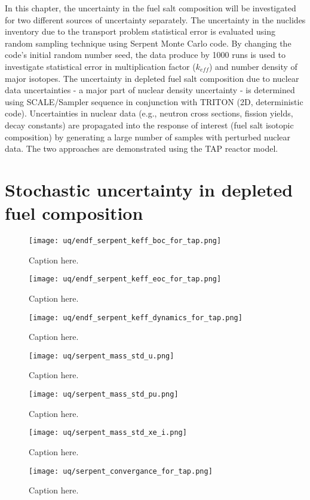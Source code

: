 In this chapter, the uncertainty in the fuel salt composition will be 
investigated for two different sources of uncertainty separately. The 
uncertainty in the nuclides inventory due to the transport problem statistical 
error is evaluated using random sampling technique using Serpent Monte Carlo 
code. By changing the code's initial random number seed, the data produce by 
1000 runs is used to investigate statistical error in multiplication factor 
($k_{eff}$) and number density of major isotopes. The uncertainty in depleted 
fuel salt composition due to nuclear data uncertainties - a major part of 
nuclear density uncertainty - is determined using SCALE/Sampler sequence in 
conjunction with TRITON (2D, deterministic code). Uncertainties in nuclear
data (e.g., neutron cross sections, fission yields, decay constants) are 
propagated into the response of
interest (fuel salt isotopic composition) by 
generating a large number of samples with perturbed nuclear data. The two 
approaches are demonstrated
using the \gls{TAP} reactor model.



\section{Stochastic uncertainty in depleted fuel composition}

\begin{figure}[hbp!] %
	\centering
	\texttt{[image: uq/endf\_serpent\_keff\_boc\_for\_tap.png]}
	\caption{Caption here.}
	\label{fig:11}
\end{figure}
\begin{figure}[hbp!] %
	\centering
	\texttt{[image: uq/endf\_serpent\_keff\_eoc\_for\_tap.png]}
	\caption{Caption here.}
	\label{fig:22}
\end{figure}
\begin{figure}[hbp!] %
	\centering
	\texttt{[image: uq/endf\_serpent\_keff\_dynamics\_for\_tap.png]}
	\caption{Caption here.}
	\label{fig:33}
\end{figure}
\begin{figure}[hbp!] %
	\centering
	\texttt{[image: uq/serpent\_mass\_std\_u.png]}
	\caption{Caption here.}
	\label{fig:44}
\end{figure}
\begin{figure}[hbp!] %
	\centering
	\texttt{[image: uq/serpent\_mass\_std\_pu.png]}
	\caption{Caption here.}
	\label{fig:pu}
\end{figure}
\begin{figure}[hbp!] %
	\centering
	\texttt{[image: uq/serpent\_mass\_std\_xe\_i.png]}
	\caption{Caption here.}
	\label{fig:xe-i}
\end{figure}
\begin{figure}[hbp!] %
	\centering
	\texttt{[image: uq/serpent\_convergance\_for\_tap.png]}
	\caption{Caption here.}
	\label{fig:uq-convergance}
\end{figure}

